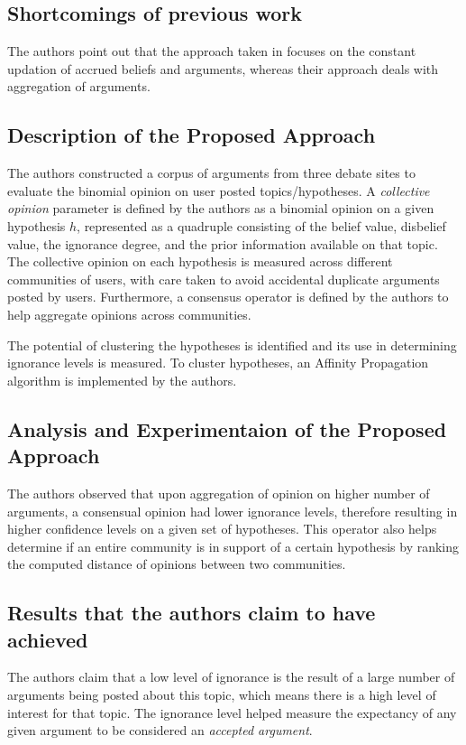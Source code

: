 \documentclass[UTF8]{article}
\begin{document}
\subsection{Shortcomings of previous work}
The authors point out that the approach taken in 
\cite{OREN2007838} focuses on the constant updation of accrued beliefs and arguments, whereas their approach deals with aggregation of arguments.

\subsection{Description of the Proposed Approach}
The authors constructed a corpus of arguments from three debate sites to evaluate the binomial opinion on user posted topics/hypotheses. A \textit{collective opinion} 
parameter is defined by the authors as a binomial opinion on a given hypothesis $h$, represented as a quadruple consisting of the belief value, disbelief value,  the ignorance degree, 
and the prior information available on that topic. The collective opinion on each hypothesis is measured across different communities of users, with care taken to avoid accidental duplicate 
arguments posted by users. Furthermore, a consensus operator is defined by the authors to help aggregate opinions across communities.

The potential of clustering the hypotheses is identified and its use in determining ignorance levels is measured. To cluster hypotheses, an Affinity Propagation algorithm \cite{Frey972} is implemented by the authors.

\subsection{Analysis and Experimentaion of the Proposed Approach}
The authors observed that upon aggregation of opinion on higher number of arguments, a consensual opinion had 
lower ignorance levels, therefore resulting in higher confidence levels on a given set of hypotheses. This operator also helps determine if 
an entire community is in support of a certain hypothesis by ranking the computed distance of opinions between two communities.


\subsection{Results that the authors claim to have achieved}
The authors claim that a low level of ignorance is the result of a large number of arguments being posted about this topic, which means there is a high level of interest for that topic. 
The ignorance level helped measure the expectancy of any given argument to be considered an \textit{accepted argument}.
\end{document}
